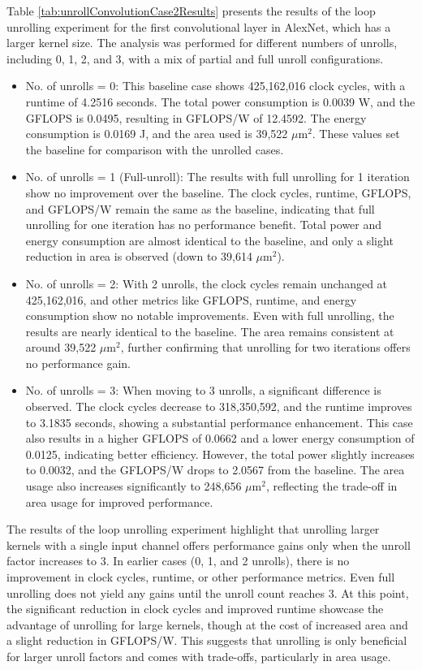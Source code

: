 Table \ref{tab:unrollConvolutionCase2Results} presents the results of the loop unrolling experiment for the first convolutional layer in AlexNet, which has a larger kernel size. The analysis was performed for different numbers of unrolls, including 0, 1, 2, and 3, with a mix of partial and full unroll configurations.
\begin{itemize}
    \item No. of unrolls = 0: This baseline case shows 425,162,016 clock cycles, with a runtime of 4.2516 seconds. The total power consumption is 0.0039 W, and the GFLOPS is 0.0495, resulting in GFLOPS/W of 12.4592. The energy consumption is 0.0169 J, and the area used is 39,522 $\mu\text{m}^2$. These values set the baseline for comparison with the unrolled cases.
    \item No. of unrolls = 1 (Full-unroll): The results with full unrolling for 1 iteration show no improvement over the baseline. The clock cycles, runtime, GFLOPS, and GFLOPS/W remain the same as the baseline, indicating that full unrolling for one iteration has no performance benefit. Total power and energy consumption are almost identical to the baseline, and only a slight reduction in area is observed (down to 39,614 $\mu\text{m}^2$).
    \item No. of unrolls = 2: With 2 unrolls, the clock cycles remain unchanged at 425,162,016, and other metrics like GFLOPS, runtime, and energy consumption show no notable improvements. Even with full unrolling, the results are nearly identical to the baseline. The area remains consistent at around 39,522 $\mu\text{m}^2$, further confirming that unrolling for two iterations offers no performance gain.
    \item No. of unrolls = 3: When moving to 3 unrolls, a significant difference is observed. The clock cycles decrease to 318,350,592, and the runtime improves to 3.1835 seconds, showing a substantial performance enhancement. This case also results in a higher GFLOPS of 0.0662 and a lower energy consumption of 0.0125, indicating better efficiency. However, the total power slightly increases to 0.0032, and the GFLOPS/W drops to 2.0567 from the baseline. The area usage also increases significantly to 248,656 $\mu\text{m}^2$, reflecting the trade-off in area usage for improved performance.
\end{itemize}

The results of the loop unrolling experiment highlight that unrolling larger kernels with a single input channel offers performance gains only when the unroll factor increases to 3. In earlier cases (0, 1, and 2 unrolls), there is no improvement in clock cycles, runtime, or other performance metrics. Even full unrolling does not yield any gains until the unroll count reaches 3. At this point, the significant reduction in clock cycles and improved runtime showcase the advantage of unrolling for large kernels, though at the cost of increased area and a slight reduction in GFLOPS/W. This suggests that unrolling is only beneficial for larger unroll factors and comes with trade-offs, particularly in area usage.

